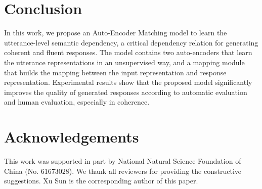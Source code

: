 \documentclass[11pt,a4paper]{article}
\begin{document}
\begin{CJK}{UTF8}{song}
\section{Conclusion}
In this work, we propose an Auto-Encoder Matching model to learn the utterance-level semantic dependency, a critical dependency relation for generating coherent and fluent responses. The model contains two auto-encoders that learn the utterance representations in an unsupervised way, and a mapping module that builds the mapping between the input representation and response representation. Experimental results show that the proposed model significantly improves the quality of generated responses according to automatic evaluation and human evaluation, especially in coherence.  

\section*{Acknowledgements}

This work was supported in part by National Natural Science Foundation of China (No. 61673028). We thank all reviewers for providing the constructive suggestions. Xu Sun is the corresponding author of this paper.















\end{CJK}
\end{document}
